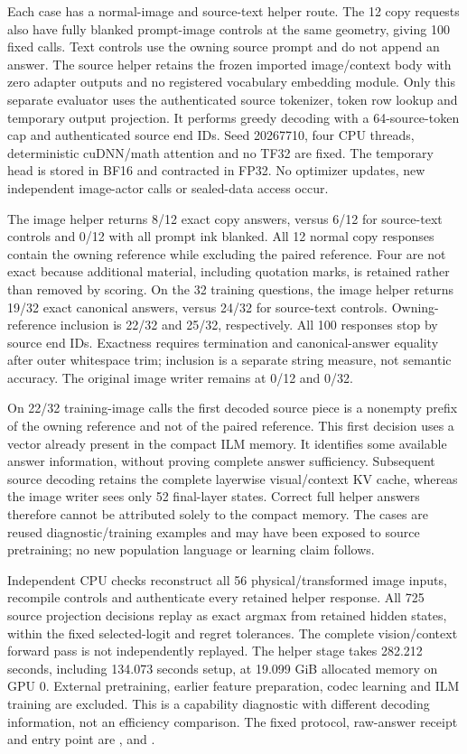 \documentclass[10pt,a4paper]{article}
\begin{document}
Each case has a normal-image and source-text helper route. The 12 copy
requests also have fully blanked prompt-image controls at the same geometry,
giving 100 fixed calls. Text controls use the owning source prompt and do not
append an answer. The source helper retains the frozen imported image/context
body with zero adapter outputs and no registered vocabulary embedding module.
Only this separate evaluator uses the authenticated source tokenizer, token
row lookup and temporary output projection. It performs greedy decoding with
a 64-source-token cap and authenticated source end IDs. Seed 20267710,
four CPU threads, deterministic cuDNN/math attention and no TF32 are fixed.
The temporary head is stored in BF16 and contracted in FP32. No optimizer
updates, new independent image-actor calls or sealed-data access occur.

The image helper returns 8/12 exact copy answers, versus 6/12 for source-text
controls and 0/12 with all prompt ink blanked. All 12 normal copy responses
contain the owning reference while excluding the paired reference. Four are
not exact because additional material, including quotation marks, is retained
rather than removed by scoring. On the 32 training questions, the image helper
returns 19/32 exact canonical answers, versus 24/32 for source-text controls.
Owning-reference inclusion is 22/32 and 25/32, respectively. All 100 responses
stop by source end IDs. Exactness requires termination and canonical-answer
equality after outer whitespace trim; inclusion is a separate string measure,
not semantic accuracy. The original image writer remains at 0/12 and 0/32.

On 22/32 training-image calls the first decoded source piece is a nonempty
prefix of the owning reference and not of the paired reference. This first
decision uses a vector already present in the compact ILM memory. It identifies
some available answer information, without proving complete answer sufficiency.
Subsequent source decoding retains the complete layerwise visual/context KV
cache, whereas the image writer sees only 52 final-layer states. Correct full
helper answers therefore cannot be attributed solely to the compact memory.
The cases are reused diagnostic/training examples and may have been exposed
to source pretraining; no new population language or learning claim follows.

Independent CPU checks reconstruct all 56 physical/transformed image inputs,
recompile controls and authenticate every retained helper response. All 725
source projection decisions replay as exact argmax from retained hidden
states, within the fixed selected-logit and regret tolerances. The complete
vision/context forward pass is not independently replayed. The helper stage
takes 282.212 seconds, including 134.073 seconds setup, at 19.099 GiB allocated
memory on GPU 0. External pretraining, earlier feature preparation, codec
learning and ILM training are excluded. This is a capability diagnostic with
different decoding information, not an efficiency comparison.
The fixed protocol, raw-answer receipt and entry point are
,
 and
.
\end{document}
